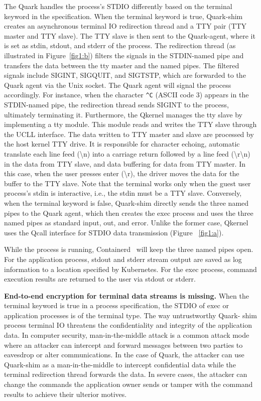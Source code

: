 The Quark handles the process's STDIO differently based on the terminal keyword in the specification.  
When the terminal keyword is true, Quark-shim creates an asynchronous terminal IO redirection thread and a TTY pair (TTY master and TTY slave). The  TTY slave is then sent to the Quark-agent, where it is set as stdin, stdout, and stderr of the 
process. The redirection thread (as illustrated in Figure~\ref{fig1:b}) filters the signals in the STDIN-named pipe and transfers the data between the tty master and the named pipes. The filtered signals include SIGINT, SIGQUIT, and SIGTSTP, 
which are forwarded to the Quark agent via the Unix socket. The Quark agent will signal the process accordingly. For instance, when the character \verb|^C| (ASCII code 3) appears in the STDIN-named pipe, the redirection thread sends SIGINT to the 
process, ultimately terminating it. Furthermore, the Qkernel manages the tty slave by implementing a tty module. This module reads and writes the TTY slave through the UCLL interface. The data written to TTY master and slave are processed by the host
kernel TTY drive. It is responsible for character echoing, automatic translate each line feed (\textbackslash n) into a carriage return followed by a line feed (\textbackslash r\textbackslash n) in the data from TTY slave, and data buffering for 
data from TTY master. In this case, when the user presses enter (\textbackslash r), the driver moves the data for the buffer to the TTY slave. Note that the terminal works only when the guest user process's stdin is interactive, i.e., the stdin must 
be a TTY slave.  Conversely, when the terminal keyword is false, Quark-shim directly sends the three named pipes to the Quark agent, which then creates the exec process and uses the three named pipes as standard input, out, and error. Unlike the former case, 
Qkernel uses the Qcall interface for STDIO data transmission (Figure ~\ref{fig1:a}). 

While the process is running, Containerd~\cite*{containerd} will keep the three named pipes open. For the application process, stdout and stderr stream output are saved as log information to a location specified by Kubernetes. For the exec process, 
command execution results are returned to the user via stdout or stderr.

\textbf{End-to-end encryption for terminal data streams is missing.} When the terminal keyword is true in a process specification, the STDIO of exec or application processes is of the terminal type. The way untrustworthy Quark- shim process terminal 
IO threatens the confidentiality and integrity of the application data. In computer security, man-in-the-middle attack\cite*{Man_in_the_middle_attack} is a common attack mode where an attacker can intercept and forward messages between two parties to eavesdrop or alter 
communications. In the case of Quark, the attacker can use Quark-shim as a man-in-the-middle to intercept confidential data while the terminal redirection thread forwards the data. In severe cases, the attacker can change the commands the application 
owner sends or tamper with the command results to achieve their ulterior motives.


